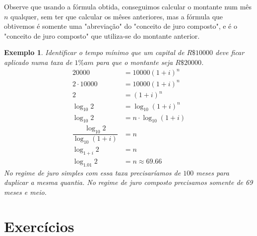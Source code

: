 \documentclass{book}
\theoremstyle{definition}
\theoremstyle{remark}
\theoremstyle{plain}
\theoremstyle{plain}
\theoremstyle{plain}
\theoremstyle{plain}
\newtheorem{example}{Exemplo}
\begin{document}
        Observe que usando a fórmula obtida, conseguimos calcular
        o montante num mês $n$ qualquer, sem ter que calcular os mêses anteriores,
        mas a fórmula que obtivemos é somente uma "abreviação" do "conceito de juro composto",
        e é o "conceito de juro composto" que utiliza-se do montante anterior. 

        \begin{example}
            Identificar o tempo mínimo que um capital de $R\$ \num{10000}$ deve ficar aplicado numa taxa
            de $1\%am$ para que o montante seja $R\$ \num{20000}$. 
            \begin{align}
                \num{20000} &= \num{10000}(1+i)^n \\
                2 \cdot \num{10000} &= \num{10000}(1+i)^n \\
                2 &= (1+i)^n  \\
                \log_{10} 2 &= \log_{10}(1+i)^n \\
                \log_{10} 2 &= n \cdot \log_{10}(1+i) \\
                \dfrac{\log_{10} 2}{\log_{10}(1+i)} &= n \\
                \log_{1+i} 2 &= n \\
                \log_{\num{1.01}} 2 &= n \approx \num{69.66}
            \end{align}
            No regime de juro simples com essa taxa precisaríamos de $100$ meses para duplicar a mesma quantia.
            No regime de juro composto precisamos somente de 69 meses e meio.
        \end{example}
    
        \section{Exercícios}
\end{document}
